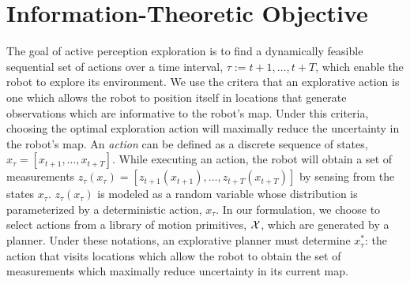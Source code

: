 \section{Information-Theoretic Objective}
\label{sec:information_theoretic_objective}

The goal of active perception exploration is to find a dynamically feasible
sequential set of actions over a time interval, $\tau := t+1,\dots,t+T$, which
enable the robot to explore its environment. We use the critera that an
explorative action is one which allows the robot to position itself in locations
that generate observations which are informative to the robot's map. Under this
criteria, choosing the optimal exploration action will maximally reduce the
uncertainty in the robot's map. An \textit{action} can be defined as a discrete sequence of
states, $x_{\tau} = \left[x_{t+1},\dots,x_{t+T}\right]$. While executing an action,
the robot will obtain a set of measurements $z_{\tau}(x_{\tau}) =
\left[z_{t+1}(x_{t+1}),\dots,z_{t+T}(x_{t+T})\right]$ by sensing from the states
$x_{\tau}$. $z_{\tau}(x_{\tau})$ is modeled as a random variable whose distribution
is parameterized by a deterministic action, $x_{\tau}$. In our formulation, we
choose to select actions from a library of motion primitives, $\mathcal{X}$, which
are generated by a planner. Under these notations, an explorative planner must
determine $x_{\tau}^{*}$: the action that visits locations which allow the robot
to obtain the set of measurements which maximally reduce uncertainty in its
current map.

